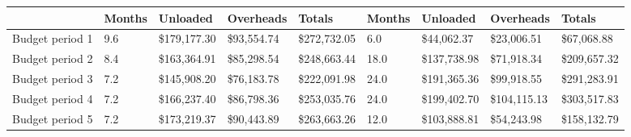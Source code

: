 \begin{tabular}{lllllllll}
\toprule
{} & Months &  Unloaded & Overheads &    Totals & Months & Unloaded & Overheads & Totals \\
\midrule
Budget period 1 &       9.6 &  \$179,177.30 &   \$93,554.74 &  \$272,732.05 &            6.0 &       \$44,062.37 &        \$23,006.51 &     \$67,068.88 \\
Budget period 2 &       8.4 &  \$163,364.91 &   \$85,298.54 &  \$248,663.44 &           18.0 &      \$137,738.98 &        \$71,918.34 &    \$209,657.32 \\
Budget period 3 &       7.2 &  \$145,908.20 &   \$76,183.78 &  \$222,091.98 &           24.0 &      \$191,365.36 &        \$99,918.55 &    \$291,283.91 \\
Budget period 4 &       7.2 &  \$166,237.40 &   \$86,798.36 &  \$253,035.76 &           24.0 &      \$199,402.70 &       \$104,115.13 &    \$303,517.83 \\
Budget period 5 &       7.2 &  \$173,219.37 &   \$90,443.89 &  \$263,663.26 &           12.0 &      \$103,888.81 &        \$54,243.98 &    \$158,132.79 \\
\bottomrule
\end{tabular}

